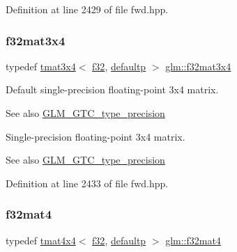 Definition at line 2429 of file fwd.\+hpp.

\mbox{\label{group__gtc__type__precision_ga9995b357aa1e9603adad780cfde1aa07}} 
\subsubsection{\texorpdfstring{f32mat3x4}{f32mat3x4}}
{\footnotesize\ttfamily typedef \mbox{\hyperlink{structglm_1_1tmat3x4}{tmat3x4}}$<$ \mbox{\hyperlink{group__gtc__type__precision_ga0ec999b57f5330d9021256e96038df04}{f32}}, \mbox{\hyperlink{namespaceglm_a0f04f086094c747d227af4425893f545a9d21ccd8b5a009ec7eb7677befc3bf51}{defaultp}} $>$ \mbox{\hyperlink{group__gtc__type__precision_ga9995b357aa1e9603adad780cfde1aa07}{glm\+::f32mat3x4}}}

Default single-\/precision floating-\/point 3x4 matrix. \begin{DoxySeeAlso}{See also}
\mbox{\hyperlink{group__gtc__type__precision}{G\+L\+M\+\_\+\+G\+T\+C\+\_\+type\+\_\+precision}}
\end{DoxySeeAlso}
Single-\/precision floating-\/point 3x4 matrix. \begin{DoxySeeAlso}{See also}
\mbox{\hyperlink{group__gtc__type__precision}{G\+L\+M\+\_\+\+G\+T\+C\+\_\+type\+\_\+precision}} 
\end{DoxySeeAlso}


Definition at line 2433 of file fwd.\+hpp.

\mbox{\label{group__gtc__type__precision_ga47bc5ddfbd368423c9b762c03ba7e77f}} 
\subsubsection{\texorpdfstring{f32mat4}{f32mat4}}
{\footnotesize\ttfamily typedef \mbox{\hyperlink{structglm_1_1tmat4x4}{tmat4x4}}$<$ \mbox{\hyperlink{group__gtc__type__precision_ga0ec999b57f5330d9021256e96038df04}{f32}}, \mbox{\hyperlink{namespaceglm_a0f04f086094c747d227af4425893f545a9d21ccd8b5a009ec7eb7677befc3bf51}{defaultp}} $>$ \mbox{\hyperlink{group__gtc__type__precision_ga47bc5ddfbd368423c9b762c03ba7e77f}{glm\+::f32mat4}}}

